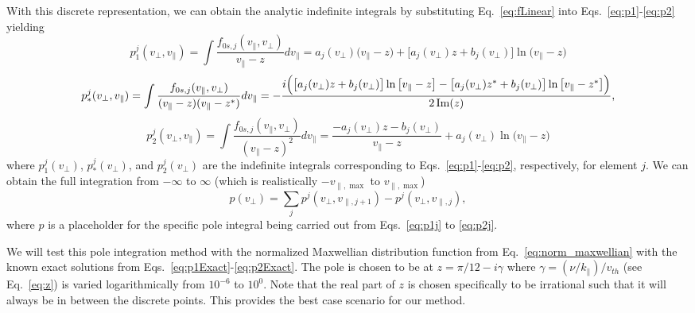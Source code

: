 With this discrete representation, we can obtain the analytic indefinite integrals by substituting Eq.~\ref{eq:fLinear} into Eqs.~\ref{eq:p1}-\ref{eq:p2} yielding
\begin{equation}
	p_1^j (v_\perp, v_\parallel) = \int \frac{f_{0s,j}(v_\parallel,v_\perp)}{v_\parallel - z} dv_\parallel = 
	a_j(v_\perp) \big(v_\parallel-z\big) + \big[ a_j(v_\perp) z + b_j(v_\perp) ] \ln \big( v_\parallel - z \big)
	\label{eq:p1j}
\end{equation}
\begin{equation}
	p_*^j (v_\perp, v_\parallel) =\int \frac{f_{0s,j}(v_\parallel,v_\perp)}{(v_\parallel - z)(v_\parallel - z^*)} dv_\parallel = 
	- \frac{i \Big( \big[ a_j(v_\perp)z + b_j(v_\perp)\big] \ln \big[ v_\parallel-z \big] - 
		\big[ a_j(v_\perp)z^* + b_j(v_\perp)\big] \ln \big[ v_\parallel-z^* \big] 
		\Big)  }{2 \operatorname{Im}(z)},
	\label{eq:pstarj}
\end{equation}
\begin{equation}
	p_2^j (v_\perp, v_\parallel) =\int \frac{f_{0s,j}(v_\parallel,v_\perp)}{(v_\parallel - z)^2} dv_\parallel = 
	\frac{-a_j(v_\perp)z - b_j(v_\perp)}{v_\parallel - z} + a_j(v_\perp) \ln\big(v_\parallel-z\big)
	\label{eq:p2j}
\end{equation}
where $p_1^j(v_\perp)$, $p_*^j(v_\perp)$, and $p_2^j(v_\perp)$ are the indefinite integrals corresponding to 
Eqs.~\ref{eq:p1}-\ref{eq:p2}, respectively, for element $j$.
We can obtain the full integration from $-\infty$ to $\infty$ (which is realistically $-v_{\parallel,\max}$ to $v_{\parallel,\max}$)
\begin{equation}
	p(v_\perp) = \sum_j p^j(v_\perp, v_{\parallel,j+1}) - p^j(v_\perp, v_{\parallel,j}),
	\label{eq:finalPoleIntegral}
\end{equation}
where $p$ is a placeholder for the specific pole integral being carried out from Eqs.~\ref{eq:p1j} to \ref{eq:p2j}.


We will test this pole integration method with the normalized Maxwellian distribution function from Eq.~\ref{eq:norm_maxwellian} with the known exact solutions from Eqs.~\ref{eq:p1Exact}-\ref{eq:p2Exact}.
The pole is chosen to be at $z=\pi/12 - i \gamma$ where $\gamma=(\nu/k_\parallel)/v_{th}$ (see Eq.~\ref{eq:z}) is varied logarithmically from $10^{-6}$ to $10^{0}$.
Note that the real part of $z$ is chosen specifically to be irrational such that it will always be in between the discrete points. 
This provides the best case scenario for our method.

